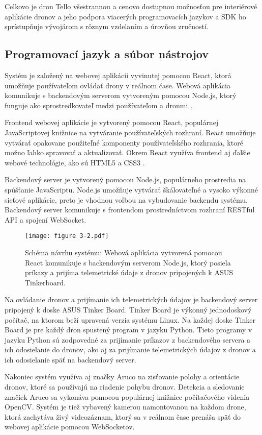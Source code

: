Celkovo je dron Tello všestrannou a cenovo dostupnou možnosťou pre interiérové aplikácie dronov a jeho podpora viacerých programovacích jazykov a SDK ho sprístupňuje vývojárom s rôznym vzdelaním a úrovňou zručností. 

\subsection{Programovací jazyk a súbor nástrojov}
Systém je založený na webovej aplikácii vyvinutej pomocou React, ktorá umožňuje používateľom ovládať drony v reálnom čase. Webová aplikácia komunikuje s backendovým serverom vytvoreným pomocou Node.js, ktorý funguje ako sprostredkovateľ medzi používateľom a dronmi \citep{TelloSDK}.

Frontend webovej aplikácie je vytvorený pomocou React, populárnej JavaScriptovej knižnice na vytváranie používateľských rozhraní. React umožňuje vytvárať opakovane použiteľné komponenty používateľského rozhrania, ktoré možno ľahko spravovať a aktualizovať. Okrem React využíva frontend aj ďalšie webové technológie, ako sú HTML5 a CSS3 \citep{TelloSDK}.

Backendový server je vytvorený pomocou Node.js, populárneho prostredia na spúšťanie JavaScriptu. Node.js umožňuje vytvárať škálovateľné a vysoko výkonné sieťové aplikácie, preto je vhodnou voľbou na vybudovanie backendu systému. Backendový server komunikuje s frontendom prostredníctvom rozhraní RESTful API a spojení WebSocket.

\begin{figure}[ht!]
    \centering
    \texttt{[image: figure 3-2.pdf]}
    \caption{Schéma návrhu systému: Webová aplikácia vytvorená pomocou React komunikuje s backendovým serverom Node.js, ktorý posiela príkazy a prijíma telemetrické údaje z dronov pripojených k ASUS Tinkerboard.}
    \label{o:3-2}
\end{figure}  

Na ovládanie dronov a prijímanie ich telemetrických údajov je backendový server pripojený k doske ASUS Tinker Board. Tinker Board je výkonný jednodoskový počítač, na ktorom beží upravená verzia systému Linux. Na každej doske Tinker Board je pre každý dron spustený program v jazyku Python. Tieto programy v jazyku Python sú zodpovedné za prijímanie príkazov z backendového servera a ich odosielanie do dronov, ako aj za prijímanie telemetrických údajov z dronov a ich odosielanie späť na backendový server.

Nakoniec systém využíva aj značky Aruco na zisťovanie polohy a orientácie dronov, ktoré sa používajú na riadenie pohybu dronov. Detekcia a sledovanie značiek Aruco sa vykonáva pomocou populárnej knižnice počítačového videnia OpenCV. Systém je tiež vybavený kamerou namontovanou na každom drone, ktorá zachytáva živý videozáznam, ktorý sa v reálnom čase prenáša späť do webovej aplikácie pomocou WebSocketov.

